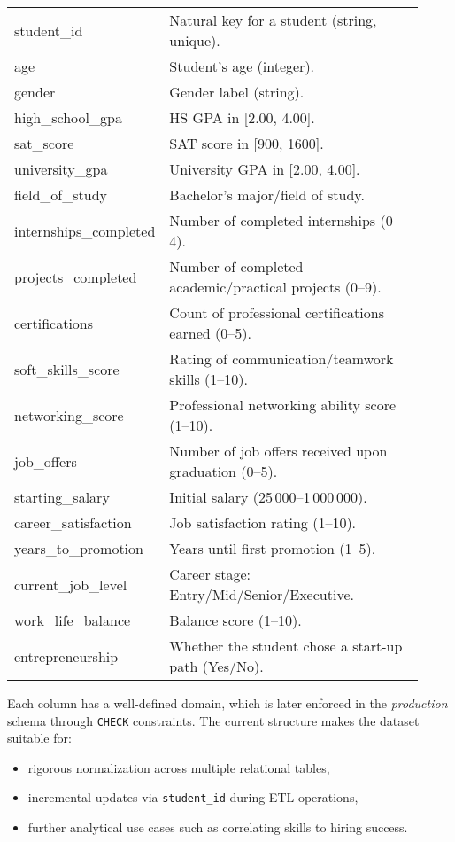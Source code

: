\documentclass[11pt]{article}
\begin{document}
\begin{longtable}{>{\ttfamily}p{0.28\linewidth}p{0.64\linewidth}}
\toprule
student\_id & Natural key for a student (string, unique).\\
age & Student's age (integer).\\
gender & Gender label (string).\\
high\_school\_gpa & HS GPA in [2.00, 4.00].\\
sat\_score & SAT score in [900, 1600].\\
university\_gpa & University GPA in [2.00, 4.00].\\
field\_of\_study & Bachelor's major/field of study.\\
internships\_completed & Number of completed internships (0--4).\\
projects\_completed & Number of completed academic/practical projects (0--9).\\
certifications & Count of professional certifications earned (0--5).\\
soft\_skills\_score & Rating of communication/teamwork skills (1--10).\\
networking\_score & Professional networking ability score (1--10).\\
job\_offers & Number of job offers received upon graduation (0--5).\\
starting\_salary & Initial salary (25\,000--1\,000\,000).\\
career\_satisfaction & Job satisfaction rating (1--10).\\
years\_to\_promotion & Years until first promotion (1--5).\\
current\_job\_level & Career stage: Entry/Mid/Senior/Executive.\\
work\_life\_balance & Balance score (1--10).\\
entrepreneurship & Whether the student chose a start-up path (Yes/No).\\
\bottomrule
\end{longtable}

\noindent Each column has a well-defined domain, which is later enforced in the \textit{production} schema through \texttt{CHECK} constraints. The current structure makes the dataset suitable for:
\begin{itemize}
\item rigorous normalization across multiple relational tables,
\item incremental updates via \texttt{student\_id} during ETL operations,
\item further analytical use cases such as correlating skills to hiring success.
\end{itemize}
\end{document}
